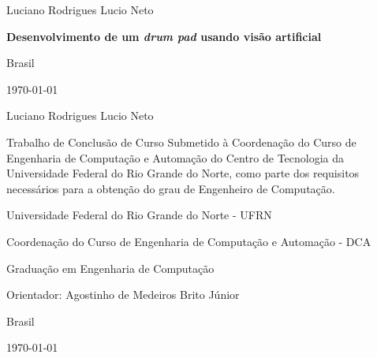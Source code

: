 \documentclass[12pt]{report}
\def\worktitle{Desenvolvimento de um {\it drum pad} usando visão artificial}
\def\workauthor{Luciano Rodrigues Lucio Neto}
\begin{document}
\begin{titlepage}

	\centering
	{\normalsize \workauthor \par}
	\vfill
	{\Large\bfseries \worktitle \par}
	\vfill


	{\normalsize Brasil\par}
	{\normalsize \monthyeardate\today}
\end{titlepage}

\begin{titlepage}

	\centering
	{\normalsize \workauthor\par}
	\vfill
	\centering
	{\Large\bfseries \par}
	\vfill

	\begin{flushright}	
	\begin{minipage}{15em}	
  	Trabalho de Conclusão de Curso Submetido à Coordenação do Curso de Engenharia de Computação e Automação do Centro de Tecnologia da Universidade Federal do Rio Grande do Norte, como parte dos requisitos necessários para a obtenção do grau de Engenheiro de Computação.
	\end{minipage}
	\end{flushright}	
	\vfill
	
	
	{\small Universidade Federal do Rio Grande do Norte - UFRN \par}
	{\small Coordenação do Curso de Engenharia de Computação e Automação - DCA \par}
	{\small Graduação em Engenharia de Computação \par}
	\vfill
	\normalsize
	\centering
	{\normalsize Orientador: Agostinho de Medeiros Brito Júnior \par}
	\vfill
	{\normalsize Brasil\par}
	{\normalsize \monthyeardate\today}
\end{titlepage}
\end{document}
